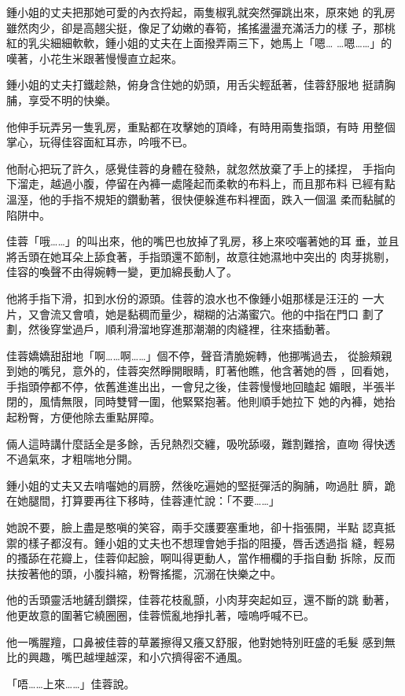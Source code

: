 鍾小姐的丈夫把那她可愛的內衣捋起，兩隻椒乳就突然彈跳出來，原來她
的乳房雖然肉少，卻是高翹尖挺，像足了幼嫩的春筍，搖搖盪盪充滿活力的樣
子，那桃紅的乳尖細細軟軟，鍾小姐的丈夫在上面撥弄兩三下，她馬上「嗯…
…嗯……」的嘆著，小花生米跟著慢慢直立起來。

鍾小姐的丈夫打鐵趁熱，俯身含住她的奶頭，用舌尖輕舐著，佳蓉舒服地
挺請胸脯，享受不明的快樂。

他伸手玩弄另一隻乳房，重點都在攻擊她的頂峰，有時用兩隻指頭，有時
用整個掌心，玩得佳容面紅耳赤，吟哦不已。

他耐心把玩了許久，感覺佳蓉的身體在發熱，就忽然放棄了手上的揉捏，
手指向下溜走，越過小腹，停留在內褲一處隆起而柔軟的布料上，而且那布料
已經有點溫溼，他的手指不規矩的鑽動著，很快便躲進布料裡面，跌入一個溫
柔而黏膩的陷阱中。

佳蓉「哦……」的叫出來，他的嘴巴也放掉了乳房，移上來咬囓著她的耳
垂，並且將舌頭在她耳朵上舔食著，手指頭還不節制，故意往她濕地中突出的
肉芽挑剔，佳容的喚聲不由得婉轉一變，更加綿長動人了。

他將手指下滑，扣到水份的源頭。佳蓉的浪水也不像鍾小姐那樣是汪汪的
一大片，又會流又會噴，她是黏稠而量少，糊糊的沾滿蜜穴。他的中指在門口
劃了劃，然後穿堂過戶，順利滑溜地穿進那潮潮的肉縫裡，往來插動著。

佳蓉嬌嬌甜甜地「啊……啊……」個不停，聲音清脆婉轉，他挪嘴過去，
從臉頰親到她的嘴兒，意外的，佳蓉突然睜開眼睛，盯著他瞧，他含著她的唇
，回看她，手指頭停都不停，依舊進進出出，一會兒之後，佳蓉慢慢地回瞌起
媚眼，半張半閉的，風情無限，同時雙臂一圍，他緊緊抱著。他則順手她拉下
她的內褲，她抬起粉臀，方便他除去重點屏障。

倆人這時講什麼話全是多餘，舌兒熱烈交纏，吸吮舔啜，難割難捨，直吻
得快透不過氣來，才粗喘地分開。

鍾小姐的丈夫又去啃囓她的肩膀，然後吃遍她的堅挺彈活的胸脯，吻過肚
臍，跪在她腿間，打算要再往下移時，佳蓉連忙說：「不要……」

她說不要，臉上盡是憨嗔的笑容，兩手交護要塞重地，卻十指張開，半點
認真抵禦的樣子都沒有。鍾小姐的丈夫也不想理會她手指的阻擾，唇舌透過指
縫，輕易的搔舔在花瓣上，佳蓉仰起臉，啊叫得更動人，當作柵欄的手指自動
拆除，反而扶按著他的頭，小腹抖縮，粉臀搖擺，沉溺在快樂之中。

他的舌頭靈活地鏟刮鑽探，佳蓉花枝亂顫，小肉芽突起如豆，還不斷的跳
動著，他更故意的圍著它繞圈圈，佳蓉慌亂地掙扎著，噎嗚呼喊不已。

他一嘴腥羶，口鼻被佳蓉的草叢擦得又癢又舒服，他對她特別旺盛的毛髮
感到無比的興趣，嘴巴越埋越深，和小穴擠得密不通風。

「唔……上來……」佳蓉說。

